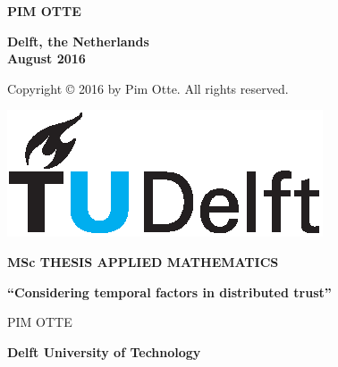 \documentclass[a4paper,11pt]{book}
\theoremstyle{definition}
\begin{document}
\begin{titlepage}
\begin{center}
\vspace{1cm}

\textbf{PIM OTTE}\\


\textbf{Delft, the Netherlands \\
August 2016} \\

\vspace{1cm}

Copyright \copyright{} 2016 by Pim Otte. All rights reserved.
\end{center}

\end{titlepage}

\newpage

\thispagestyle{empty}

\quad

\newpage

\thispagestyle{empty}

\hspace{10cm}
\begin{minipage}{5cm}
  \includegraphics{tudelft.eps}
\end{minipage}

\begin{center}

\textbf{\large{MSc THESIS APPLIED MATHEMATICS}}

\vspace{1.5cm}

\textbf{``Considering temporal factors in distributed trust''}

\vspace{1.5cm}

PIM OTTE\\

\vspace{1.5cm}

\textbf{\large{Delft University of Technology}}


\end{center}
\end{document}
